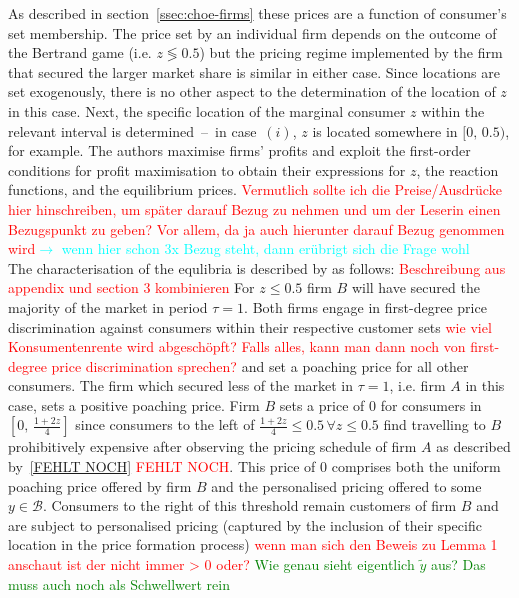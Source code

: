 \documentclass[a4paper, 11 pt, fleqn]{article}
\begin{document}
As described in section~\ref{ssec:choe-firms} these prices are a function of consumer's set membership. The price set by an individual firm depends
on the outcome of the Bertrand game (i.e. $z \lessgtr 0.5$) but the pricing regime implemented by the firm that secured the larger market
share is similar in either case. Since locations are set exogenously, there is no other aspect to the determination of the location of $z$
in this case. Next, the specific location of the marginal consumer $z$ within the relevant interval is determined~--~in case~$(i)$,
$z$ is located somewhere in $[0,\,0.5)$, for example. The authors maximise firms' profits and exploit the first-order conditions for
profit maximisation to obtain their expressions for $z$, the reaction functions, and the equilibrium prices.
\textcolor{red}{Vermutlich sollte ich die Preise/Ausdrücke hier hinschreiben, um später darauf Bezug zu nehmen und um der Leserin einen Bezugspunkt
zu geben? Vor allem, da ja auch hierunter darauf Bezug genommen wird}\textcolor{cyan}{$\to$ wenn hier schon 3x Bezug steht, dann erübrigt sich die Frage wohl}\\
%
The characterisation of the equlibria is described by \citet[p. 5682]{Choe.2018} as follows: \textcolor{red}{Beschreibung aus appendix und section 3 kombinieren}
For $z \leq 0.5$ firm $B$ will have secured the majority of the market in period $\tau = 1$. Both firms engage in first-degree price
discrimination against consumers within their respective customer sets \textcolor{red}{wie viel Konsumentenrente wird abgeschöpft? Falls alles, kann man dann noch von first-degree price discrimination sprechen?}
and set a poaching price for all other consumers. The firm which secured less of the market in $\tau = 1$, i.e. firm $A$ in this case,
sets a positive poaching price. Firm $B$ sets a price of $0$ for consumers in $[0,\,\frac{1+2z}{4}]$ since consumers to the left of $\frac{1+2z}{4} \leq 0.5 \,\forall z \leq 0.5$
find travelling to $B$ prohibitively expensive after observing the pricing schedule of firm $A$ as described by~\eqref{FEHLT NOCH} \textcolor{red}{FEHLT NOCH}.
This price of $0$ comprises both the uniform poaching price offered by firm $B$ and the personalised pricing offered to some $y \in \mathscr{B}$.
Consumers to the right of this threshold remain customers of firm $B$ and are subject to personalised pricing (captured by the inclusion of their
specific location in the price formation process) \textcolor{red}{wenn man sich den Beweis zu Lemma 1 anschaut ist der nicht immer > 0 oder?}
\textcolor{green}{Wie genau sieht eigentlich $\tilde{y}$ aus? Das muss auch noch als Schwellwert rein}
\end{document}
